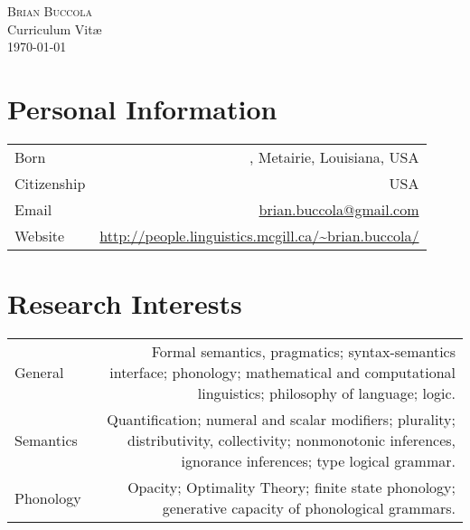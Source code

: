 \documentclass[11pt,letterpaper]{article}
\makeatletter
\newcommand{\name}{Brian Buccola}
\newcommand{\bodywidth}{0.81}
\newcommand{\myvrule}{\color{lightgray}\vrule width 1.0pt}
\newenvironment{cvsection}{%
  \renewcommand{\arraystretch}{1.60}
  \begin{longtable}[l]{@{} L R @{}}
}{%
  \end{longtable}
}
\makeatother
\begin{document}



\begin{center}
  {\Huge\scshape \name} \\[\baselineskip]

  Curriculum Vit\ae \\
  \today
\end{center}

\section*{Personal Information}

\begin{cvsection}
  Born & , Metairie, Louisiana, USA \\

  Citizenship & USA \\


  Email & \href{mailto:brian.buccola@gmail.com} {\ttfamily
    brian.buccola@gmail.com} \\

  Website & \url{http://people.linguistics.mcgill.ca/~brian.buccola/}
\end{cvsection}

\section*{Research Interests}

\begin{cvsection}
  General & Formal semantics, pragmatics; syntax-semantics interface;
  phonology; mathematical and computational linguistics; philosophy of
  language; logic. \\

  Semantics & Quantification; numeral and scalar modifiers; plurality;
  distributivity, collectivity; nonmonotonic inferences, ignorance inferences;
  type logical grammar. \\

  Phonology & Opacity; Optimality Theory; finite state phonology; generative
  capacity of phonological grammars. \\
\end{cvsection}
\end{document}
